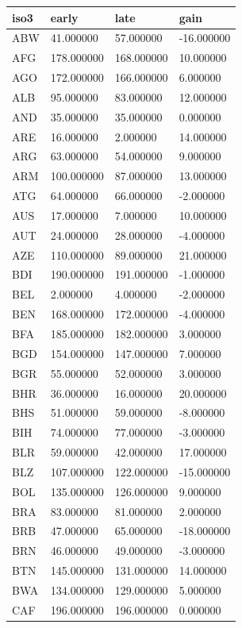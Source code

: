 \begin{tabular}{llll}
\hline
iso3 & early & late & gain \\
\hline
ABW & 41.000000 & 57.000000 & -16.000000 \\
AFG & 178.000000 & 168.000000 & 10.000000 \\
AGO & 172.000000 & 166.000000 & 6.000000 \\
ALB & 95.000000 & 83.000000 & 12.000000 \\
AND & 35.000000 & 35.000000 & 0.000000 \\
ARE & 16.000000 & 2.000000 & 14.000000 \\
ARG & 63.000000 & 54.000000 & 9.000000 \\
ARM & 100.000000 & 87.000000 & 13.000000 \\
ATG & 64.000000 & 66.000000 & -2.000000 \\
AUS & 17.000000 & 7.000000 & 10.000000 \\
AUT & 24.000000 & 28.000000 & -4.000000 \\
AZE & 110.000000 & 89.000000 & 21.000000 \\
BDI & 190.000000 & 191.000000 & -1.000000 \\
BEL & 2.000000 & 4.000000 & -2.000000 \\
BEN & 168.000000 & 172.000000 & -4.000000 \\
BFA & 185.000000 & 182.000000 & 3.000000 \\
BGD & 154.000000 & 147.000000 & 7.000000 \\
BGR & 55.000000 & 52.000000 & 3.000000 \\
BHR & 36.000000 & 16.000000 & 20.000000 \\
BHS & 51.000000 & 59.000000 & -8.000000 \\
BIH & 74.000000 & 77.000000 & -3.000000 \\
BLR & 59.000000 & 42.000000 & 17.000000 \\
BLZ & 107.000000 & 122.000000 & -15.000000 \\
BOL & 135.000000 & 126.000000 & 9.000000 \\
BRA & 83.000000 & 81.000000 & 2.000000 \\
BRB & 47.000000 & 65.000000 & -18.000000 \\
BRN & 46.000000 & 49.000000 & -3.000000 \\
BTN & 145.000000 & 131.000000 & 14.000000 \\
BWA & 134.000000 & 129.000000 & 5.000000 \\
CAF & 196.000000 & 196.000000 & 0.000000 \\

\end{tabular}
